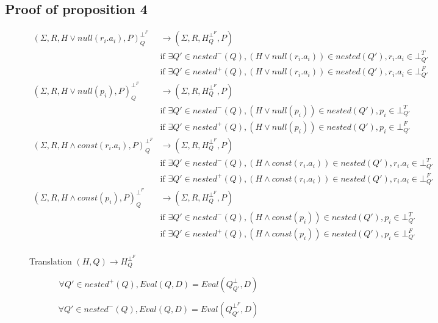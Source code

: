 \subsection{Proof of proposition 4}
		\begin{figure}[H]
		\caption{\label{hq-} Translation $(H,Q) \rightarrow H^{\bot^F} _Q$ }
			\begin{mdframed}
				\fontsize{8}{6}
		\begin{align*}
			(\Sigma,R,H \lor null(r_i.a_i),P)^{\bot^F}_Q & \rightarrow (\Sigma,R,H^{\bot^F}_{Q},P) \\
			& \mbox{if } \exists Q' \in nested^-(Q), (H\lor null(r_i.a_i)) \in nested(Q'), r_i.a_i \in \bot^T_{Q'} \\
			& \mbox{if } \exists Q' \in nested^+(Q), (H\lor null(r_i.a_i)) \in nested(Q'), r_i.a_i \in \bot^F_{Q'} \\
			(\Sigma,R,H \lor null(p_i),P)^{\bot^F}_Q & \rightarrow (\Sigma,R,H^{\bot^F}_{Q},P) \\
			& \mbox{if } \exists Q' \in nested^-(Q), (H\lor null(p_i)) \in nested(Q'), p_i \in \bot^T_{Q'} \\
			& \mbox{if } \exists Q' \in nested^+(Q), (H\lor null(p_i)) \in nested(Q'), p_i \in \bot^F_{Q'} \\
			(\Sigma,R,H \land const(r_i.a_i),P)^{\bot^F}_Q & \rightarrow (\Sigma,R,H^{\bot^F}_{Q},P) \\
			& \mbox{if } \exists Q' \in nested^-(Q), (H\land const(r_i.a_i)) \in nested(Q'), r_i.a_i \in \bot^T_{Q'} \\
			& \mbox{if } \exists Q' \in nested^+(Q), (H\land const(r_i.a_i)) \in nested(Q'), r_i.a_i \in \bot^F_{Q'} \\
			(\Sigma,R,H \land const(p_i),P)^{\bot^F}_Q & \rightarrow (\Sigma,R,H^{\bot^F}_{Q},P) \\
			& \mbox{if } \exists Q' \in nested^-(Q), (H\land const(p_i)) \in nested(Q'), p_i \in \bot^T_{Q'} \\
			& \mbox{if } \exists Q' \in nested^+(Q), (H\land const(p_i)) \in nested(Q'), p_i \in \bot^F_{Q'} \\
		\end{align*}
	\end{mdframed}
	\end{figure}
	
	\begin{mylem*}
		$$\forall Q' \in nested^+(Q), Eval(Q,D) = Eval(Q^\bot_{Q'},D)$$
	\end{mylem*}
	\begin{mylem*}
		$$\forall Q' \in nested^-(Q), Eval(Q,D) = Eval(Q^{\bot^F}_{Q'},D)$$
	\end{mylem*}

